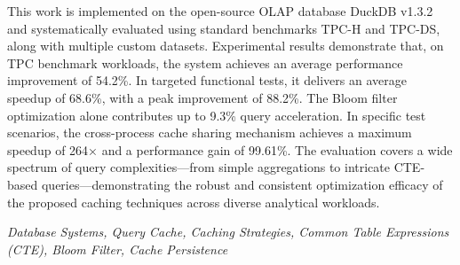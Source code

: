 This work is implemented on the open-source OLAP database DuckDB v1.3.2 and systematically evaluated using standard benchmarks TPC-H and TPC-DS, along with multiple custom datasets. Experimental results demonstrate that, on TPC benchmark workloads, the system achieves an average performance improvement of 54.2\%. In targeted functional tests, it delivers an average speedup of 68.6\%, with a peak improvement of 88.2\%. The Bloom filter optimization alone contributes up to 9.3\% query acceleration. In specific test scenarios, the cross-process cache sharing mechanism achieves a maximum speedup of 264× and a performance gain of 99.61\%. The evaluation covers a wide spectrum of query complexities—from simple aggregations to intricate CTE-based queries—demonstrating the robust and consistent optimization efficacy of the proposed caching techniques across diverse analytical workloads.

\vspace{0.5cm}
\hspace{-1cm}
{\bf{}} \textit{Database Systems, Query Cache, Caching Strategies, Common Table Expressions (CTE), Bloom Filter, Cache Persistence}







